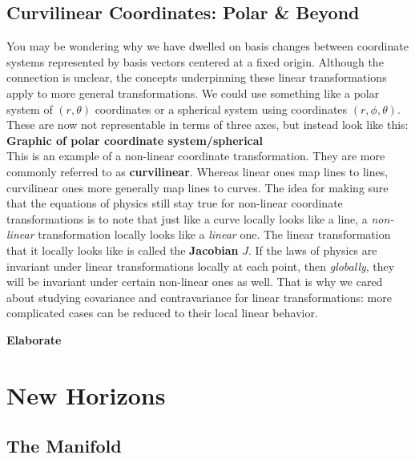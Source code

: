 	\section{Curvilinear Coordinates: Polar \& Beyond} %
	\label{sec:curvilinear_coordinates_polar_beyond}
	
	You may be wondering why we have dwelled on basis changes between coordinate systems represented by basis vectors centered at a fixed origin. Although the connection is unclear, the concepts underpinning these linear transformations apply to more general transformations.  We could use something like a polar system of $(r,\theta)$ coordinates or a spherical system using coordinates $(r, \phi, \theta)$. These are now not representable in terms of three axes, but instead look like this:\\
	
	\textbf{Graphic of polar coordinate system/spherical} \\
	
	This is an example of a non-linear coordinate transformation. They are more commonly referred to as \textbf{curvilinear}. Whereas linear ones map lines to lines, curvilinear ones more generally map lines to curves. The idea for making sure that the equations of physics still stay true for non-linear coordinate transformations is to note that just like a curve locally looks like a line, a \emph{non-linear} transformation locally looks like a \emph{linear} one. The linear transformation that it locally looks like is called the \textbf{Jacobian}  $J$. If the laws of physics are invariant under linear transformations locally at each point, then \emph{globally}, they will be invariant under certain non-linear ones as well. That is why we cared about studying covariance and contravariance for linear transformations: more complicated cases can be reduced to their local linear behavior. 
	
	
	\textbf{Elaborate}
	
\chapter{New Horizons}	
	\section{The Manifold} %
	\label{sec:the_manifold}
	
